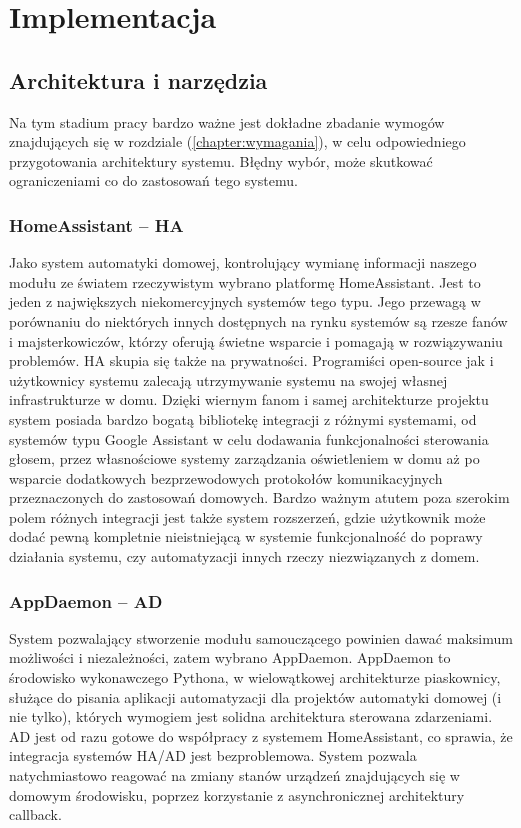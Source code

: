
\chapter{Implementacja}

\section{Architektura i narzędzia}
Na tym stadium pracy bardzo ważne jest dokładne zbadanie wymogów znajdujących się w rozdziale (\ref{chapter:wymagania}), w celu odpowiedniego przygotowania architektury systemu. Błędny wybór, może skutkować ograniczeniami co do zastosowań tego systemu.

\subsection{HomeAssistant -- HA}
Jako system automatyki domowej, kontrolujący wymianę informacji naszego modułu ze światem rzeczywistym wybrano platformę HomeAssistant. Jest to jeden z największych niekomercyjnych systemów tego typu. Jego przewagą w porównaniu do niektórych innych dostępnych na rynku systemów są rzesze fanów i majsterkowiczów, którzy oferują świetne wsparcie i pomagają w rozwiązywaniu problemów. HA skupia się także na prywatności. Programiści open-source jak i użytkownicy systemu zalecają utrzymywanie systemu na swojej własnej infrastrukturze w domu. Dzięki wiernym fanom i samej architekturze projektu system posiada bardzo bogatą bibliotekę integracji z różnymi systemami, od systemów typu Google Assistant w celu dodawania funkcjonalności sterowania głosem, przez własnościowe systemy zarządzania oświetleniem w domu aż po wsparcie dodatkowych bezprzewodowych protokołów komunikacyjnych przeznaczonych do zastosowań domowych. Bardzo ważnym atutem poza szerokim polem różnych integracji jest także system rozszerzeń, gdzie użytkownik może dodać pewną kompletnie nieistniejącą w systemie funkcjonalność do poprawy działania systemu, czy automatyzacji innych rzeczy niezwiązanych z domem.


\subsection{AppDaemon -- AD}
System pozwalający stworzenie modułu samouczącego powinien dawać maksimum możliwości i niezależności, zatem wybrano AppDaemon. AppDaemon to środowisko wykonawczego Pythona, w wielowątkowej architekturze piaskownicy, służące do pisania aplikacji automatyzacji dla projektów automatyki domowej (i nie tylko), których wymogiem jest solidna architektura sterowana zdarzeniami. AD jest od razu gotowe do współpracy z systemem HomeAssistant, co sprawia, że integracja systemów HA/AD jest bezproblemowa. System pozwala natychmiastowo reagować na zmiany stanów urządzeń znajdujących się w domowym środowisku, poprzez korzystanie z asynchronicznej architektury callback.

